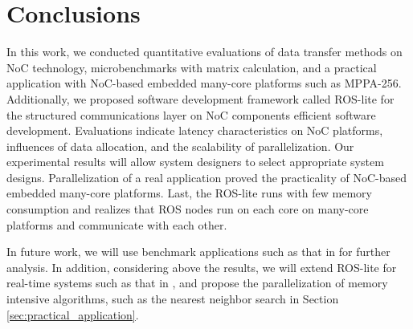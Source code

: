 \chapter{Conclusions}
\label{chap:conclusion}
In this work, we conducted quantitative evaluations of data transfer methods on NoC technology, microbenchmarks with matrix calculation, and a practical application with NoC-based embedded many-core platforms such as MPPA-256.
Additionally, we proposed software development framework called ROS-lite for the structured communications layer on NoC components efficient software development.
Evaluations indicate latency characteristics on NoC platforms, influences of data allocation, and the scalability of parallelization.
Our experimental results will allow system designers to select appropriate system designs.
Parallelization of a real application proved the practicality of NoC-based embedded many-core platforms.
Last, the ROS-lite runs with few memory consumption and realizes that ROS nodes run on each core on many-core platforms and communicate with each other.

In future work, we will use benchmark applications such as that in \cite{che2010characterization} for further analysis.
In addition, considering above the results, we will extend ROS-lite for real-time systems such as that in \cite{maruyama2016ros2}, and propose the parallelization of memory intensive algorithms, such as the nearest neighbor search in Section \ref{sec:practical_application}.







% 
% 

% 

